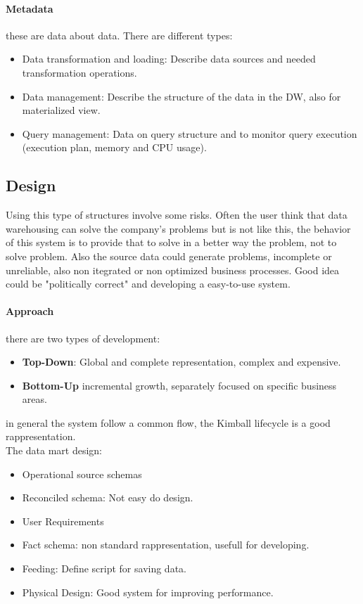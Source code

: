 \documentclass[12pt]{article}
\begin{document}
\paragraph{Metadata} these are data about data. There are different types:
\begin{itemize}
  \item Data transformation and loading: Describe data sources and needed transformation operations.
  \item Data management: Describe the structure of the data in the DW, also for materialized view.
  \item Query management: Data on query structure and to monitor query execution (execution plan, memory and CPU usage).
\end{itemize}

\subsection{Design}
Using this type of structures involve some risks. Often the user think that data warehousing can solve the company's problems but is not like this, the behavior of this system is to provide that to solve in a better way the problem, not to solve problem. Also the source data could generate problems, incomplete or unreliable, also non itegrated or non optimized business processes. Good idea could be "politically correct" and developing a easy-to-use system.\\
\paragraph{Approach} there are two types of development:
\begin{itemize}
  \item \textbf{Top-Down}: Global and complete representation, complex and expensive.
  \item \textbf{Bottom-Up} incremental growth, separately focused on specific business areas.
\end{itemize}
in general the system follow a common flow, the Kimball lifecycle is a good rappresentation.\\
The data mart design:
\begin{itemize}
  \item Operational source schemas
  \item Reconciled schema: Not easy do design.
  \item User Requirements
  \item Fact schema: non standard rappresentation, usefull for developing.
  \item Feeding: Define script for saving data.
  \item Physical Design: Good system for improving performance.
\end{itemize}
\end{document}
